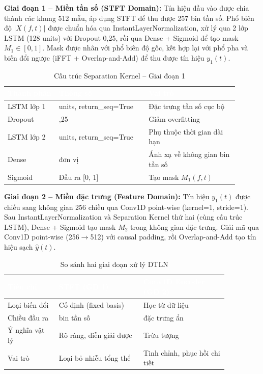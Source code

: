 \textbf{Giai đoạn 1 -- Miền tần số (STFT Domain):}
Tín hiệu đầu vào được chia thành các khung 512 mẫu, áp dụng STFT để thu được
257 bin tần số. Phổ biên độ $|X(f,t)|$ được chuẩn hóa qua InstantLayerNormalization,
xử lý qua 2 lớp LSTM (128 units) với Dropout 0,25, rồi qua Dense + Sigmoid để tạo
mask $M_1 \in [0,1]$. Mask được nhân với phổ biên độ gốc, kết hợp lại với phổ pha
và biến đổi ngược (iFFT + Overlap-and-Add) để thu được tín hiệu $y_1(t)$.

\begin{table}[htbp]
\centering
\caption{Cấu trúc Separation Kernel -- Giai đoạn 1}
\label{tab:sep-kernel}
\begin{tabular}{>{\raggedright\arraybackslash}p{0.2\linewidth} >{\centering\arraybackslash}p{0.35\linewidth} >{\raggedright\arraybackslash}p{0.35\linewidth}}
\toprule
\rowcolor{headerblue} \textcolor{white}{\textbf{Thành phần}} & \textcolor{white}{\textbf{Thông số}} & \textcolor{white}{\textbf{Vai trò}} \\
\midrule
\rowcolor{rowgray} LSTM lớp 1 & 128 units, return\_seq=True & Đặc trưng tần số cục bộ \\
Dropout & 0,25 & Giảm overfitting \\
\rowcolor{rowgray} LSTM lớp 2 & 128 units, return\_seq=True & Phụ thuộc thời gian dài hạn \\
Dense & 257 đơn vị & Ánh xạ về không gian bin tần số \\
\rowcolor{rowgray} Sigmoid & Đầu ra {[}0, 1{]} & Tạo mask $M_1(f,t)$ \\
\bottomrule
\end{tabular}
\end{table}

\textbf{Giai đoạn 2 -- Miền đặc trưng (Feature Domain):}
Tín hiệu $y_1(t)$ được chiếu sang không gian 256 chiều qua Conv1D point-wise
(kernel=1, stride=1). Sau InstantLayerNormalization và Separation Kernel thứ hai
(cùng cấu trúc LSTM), Dense + Sigmoid tạo mask $M_2$ trong không gian đặc trưng.
Giải mã qua Conv1D point-wise (256$\rightarrow$512) với causal padding, rồi Overlap-and-Add
tạo tín hiệu sạch $\hat{y}(t)$.

\begin{table}[htbp]
\centering
\caption{So sánh hai giai đoạn xử lý DTLN}
\label{tab:dual-signal}
\begin{tabular}{>{\raggedright\arraybackslash}p{0.2\linewidth} >{\centering\arraybackslash}p{0.33\linewidth} >{\centering\arraybackslash}p{0.33\linewidth}}
\toprule
\rowcolor{headerblue} \textcolor{white}{\textbf{Tiêu chí}} & \textcolor{white}{\textbf{STFT (GĐ 1)}} & \textcolor{white}{\textbf{Conv1D Encoder (GĐ 2)}} \\
\midrule
\rowcolor{rowgray} Loại biến đổi & Cố định (fixed basis) & Học từ dữ liệu \\
Chiều đầu ra & 257 bin tần số & 256 đặc trưng ẩn \\
\rowcolor{rowgray} Ý nghĩa vật lý & Rõ ràng, diễn giải được & Trừu tượng \\
Vai trò & Loại bỏ nhiễu tổng thể & Tinh chỉnh, phục hồi chi tiết \\
\bottomrule
\end{tabular}
\end{table}

